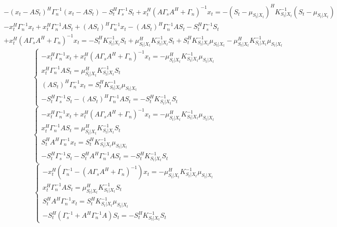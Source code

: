 \documentclass[11pt]{article}
\begin{document}
\begin{center}
\fontsize{16}{20}\selectfont {}
\end{center}
\begin{gather*}
-(x_t-A S_t)^H \Gamma_n^{-1}(x_t-A S_t)-S_t^H\Gamma_s^{-1}S_t+x_t^H (A\Gamma_s  A^H + \Gamma_n)^{-1}x_t = -(S_t-\mu_{S_t|X_t})^H K_{S_t|X_t}^{-1}(S_t-\mu_{S_t|X_t})
\nonumber
\end{gather*}
\begin{gather*}
-x_t^H\Gamma_n^{-1}x_t + x_t^H\Gamma_n^{-1}A S_t + (A S_t)^H\Gamma_n^{-1}x_t - (A S_t)^H \Gamma_n^{-1} A S_t -S_t^H\Gamma_s^{-1}S_t \\
+x_t^H (A\Gamma_s  A^H + \Gamma_n)^{-1}x_t  =-S_t^H K_{S_t|X_t}^{-1}S_t + \mu_{S_t|X_t}^H  K_{S_t|X_t}^{-1}S_t   + S_t^H K_{S_t|X_t}^{-1}\mu_{S_t|X_t} - \mu_{S_t|X_t}^H K_{S_t|X_t}^{-1}\mu_{S_t|X_t}
\end{gather*}
\begin{equation*}
\left\{ \begin{aligned} 
 -x_t^H\Gamma_n^{-1}x_t + x_t^H (A\Gamma_s  A^H + \Gamma_n)^{-1}x_t = -\mu_{S_t|X_t}^H K_{S_t|X_t}^{-1}\mu_{S_t|X_t}\\
x_t^H\Gamma_n^{-1}A S_t = \mu_{S_t|X_t}^H  K_{S_t|X_t}^{-1}S_t \\
(A S_t)^H\Gamma_n^{-1}x_t = S_t^H K_{S_t|X_t}^{-1}\mu_{S_t|X_t} \\
-S_t^H\Gamma_s^{-1}S_t - (A S_t)^H \Gamma_n^{-1} A S_t = -S_t^H K_{S_t|X_t}^{-1}S_t
\end{aligned} \right.
\end{equation*}
\begin{equation*}
\left\{ \begin{aligned} 
 -x_t^H\Gamma_n^{-1}x_t + x_t^H (A\Gamma_s  A^H + \Gamma_n)^{-1}x_t = -\mu_{S_t|X_t}^H K_{S_t|X_t}^{-1}\mu_{S_t|X_t}\\
x_t^H\Gamma_n^{-1}A S_t = \mu_{S_t|X_t}^H  K_{S_t|X_t}^{-1}S_t \\
S_t^H A^H\Gamma_n^{-1}x_t = S_t^H K_{S_t|X_t}^{-1}\mu_{S_t|X_t} \\
-S_t^H\Gamma_s^{-1}S_t - S_t^H A^H \Gamma_n^{-1} A S_t = -S_t^H K_{S_t|X_t}^{-1}S_t
\end{aligned} \right.
\end{equation*}
\begin{equation*}
\left\{ \begin{aligned} 
 -x_t^H(\Gamma_n^{-1}- (A\Gamma_s  A^H+\Gamma_n)^{-1})x_t  = -\mu_{S_t|X_t}^H K_{S_t|X_t}^{-1}\mu_{S_t|X_t}\\
x_t^H\Gamma_n^{-1}A S_t = \mu_{S_t|X_t}^H  K_{S_t|X_t}^{-1}S_t \\
S_t^H A^H\Gamma_n^{-1}x_t = S_t^H K_{S_t|X_t}^{-1}\mu_{S_t|X_t} \\
-S_t^H(\Gamma_s^{-1}+A^H \Gamma_n^{-1} A)S_t = -S_t^H K_{S_t|X_t}^{-1}S_t
\end{aligned} \right.
\end{equation*}
\end{document}
